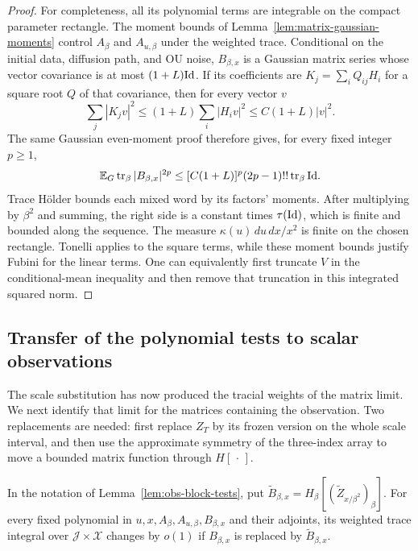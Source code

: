 \begin{proof}
For completeness, all its polynomial terms are integrable on the
compact parameter rectangle.  The moment bounds of
Lemma~\ref{lem:matrix-gaussian-moments} control $A_\beta$ and
$A_{u,\beta}$ under the weighted trace.  Conditional on the
initial data, diffusion path, and OU noise, $B_{\beta,x}$ is a
Gaussian matrix series whose vector covariance is at most
$(1+L)\mathrm{Id}$.  If its coefficients are $K_j=\sum_i Q_{ij}H_i$
for a square root $Q$ of that covariance, then for every vector $v$
\[
 \sum_j|K_jv|^2\le(1+L)\sum_i|H_iv|^2\le C(1+L)|v|^2.
\]
The same Gaussian even-moment proof therefore gives, for every fixed
integer $p\ge1$,
\begin{equation}\label{eq:obs-gaussian-moment-bound}
 \mathbb E_G\operatorname{tr}_\beta|B_{\beta,x}|^{2p}
 \le[C(1+L)]^p(2p-1)!!\operatorname{tr}_\beta\mathrm{Id}.
\end{equation}
Trace H\"older bounds each mixed word by its factors' moments.
After multiplying by $\beta^2$ and summing, the right side is a
constant times $\tau(\mathrm{Id})$, which is finite and bounded along the
sequence.  The measure $\kappa(u)\,du\,dx/x^2$ is finite on the
chosen rectangle.  Tonelli applies to the square terms, while these
moment bounds justify Fubini for the linear terms.  One can
equivalently first truncate $V$ in the conditional-mean inequality
and then remove that truncation in this integrated squared norm.
\end{proof}

\subsection{Transfer of the polynomial tests to scalar observations}

The scale substitution has now produced the tracial weights of the
matrix limit.  We next identify that limit for the matrices containing
the observation.  Two replacements are needed: first replace $Z_T$
by its frozen version on the whole scale interval, and then use the
approximate symmetry of the three-index array to move a bounded
matrix function through $H[\,\cdot\,]$.

\begin{lemma}
\label{lem:obs-polynomial-replacement}
In the notation of Lemma~\ref{lem:obs-block-tests}, put
$\widetilde B_{\beta,x}
=H_\beta[(\widetilde Z_{x/\beta^2})_\beta]$.
For every fixed polynomial in
$u,x,A_\beta,A_{u,\beta},B_{\beta,x}$ and their adjoints, its
weighted trace integral over $\mathcal J\times\mathcal X$ changes
by $o(1)$ if $B_{\beta,x}$ is replaced by
$\widetilde B_{\beta,x}$.
\end{lemma}

